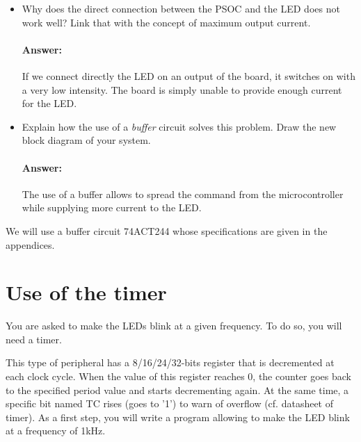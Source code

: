 \documentclass[11pt,a4paper]{article}
\theoremstyle{definition}%
\newcommand{\reponse}[1]{%
	\ifthenelse {\boolean{corrige}} {\paragraph{Answer:} \color{darkblue}   #1\color{black}} {}
 }
\begin{document}

\begin{itemize}
	\item Why does the direct connection between the PSOC and the LED does not work well?
	Link that with the concept of maximum output current.
	\reponse{
        If we connect directly the LED on an output of the board, it switches on with a very low intensity. The board is simply unable to provide enough current for the LED.
	}
	\item Explain how the use of a \textit{buffer} circuit solves this problem.
	Draw the new block diagram of your system.
	\reponse{
		The use of a buffer allows to spread the command from the microcontroller while supplying more current to the LED.
	}
\end{itemize}
We will use a buffer circuit 74ACT244 whose specifications are given in the appendices.





\section{Use of the timer}
You are asked to make the LEDs blink at a given frequency. To do so, you will need a timer. 

This type of peripheral has a 8/16/24/32-bits register that is decremented at each clock cycle. When the value of this register reaches 0, the counter goes back to the specified period value and starts decrementing again. At the same time, a specific bit named TC rises (goes to '1') to warn of overflow (cf. datasheet of timer).
As a first step, you will write a program allowing to make the LED blink at a frequency of 1kHz.
\end{document}
